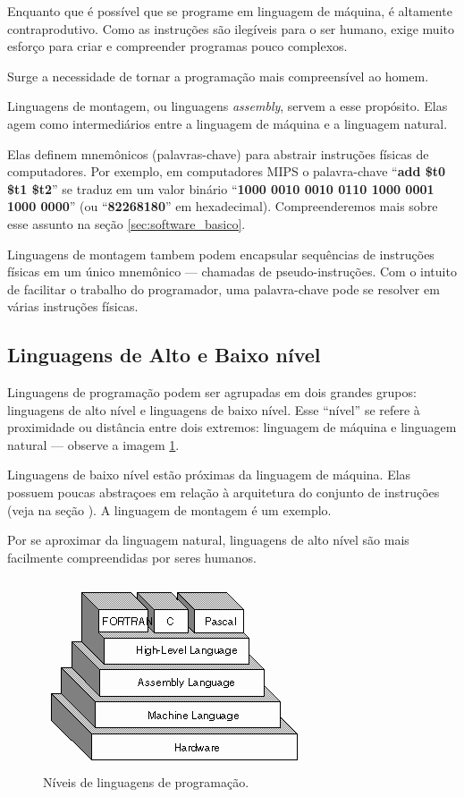 Enquanto que é possível que se programe em linguagem de máquina, é altamente
contraprodutivo. Como as instruções são ilegíveis para o ser humano, exige muito
esforço para criar e compreender programas pouco complexos.

Surge a necessidade de tornar a programação mais compreensível ao homem.

Linguagens de montagem, ou linguagens \textit{assembly}, servem a esse
propósito. Elas agem como intermediários entre a linguagem de máquina e a
linguagem natural.

Elas definem mnemônicos (palavras-chave) para abstrair instruções físicas de
computadores. Por exemplo, em computadores MIPS o palavra-chave ``\textbf{add
  \$t0 \$t1 \$t2}'' se traduz em um valor binário ``\textbf{1000 0010 0010 0110
  1000 0001 1000 0000}'' (ou ``\textbf{82268180}'' em
hexadecimal). Compreenderemos mais sobre esse assunto na seção
\ref{sec:software_basico}.

Linguagens de montagem tambem podem encapsular sequências de instruções físicas
em um único mnemônico --- chamadas de pseudo-instruções. Com o intuito de
facilitar o trabalho do programador, uma palavra-chave pode se resolver em
várias instruções físicas.

\subsection{Linguagens de Alto e Baixo nível}

Linguagens de programação podem ser agrupadas em dois grandes grupos: linguagens
de alto nível e linguagens de baixo nível. Esse ``nível'' se refere à
proximidade ou distância entre dois extremos: linguagem de máquina e linguagem
natural --- observe a imagem \ref{linguagens}.

Linguagens de baixo nível estão próximas da linguagem de máquina. Elas possuem
poucas abstraçoes em relação à arquitetura do conjunto de instruções (veja na
seção \label{subsec:apd}). A linguagem de montagem é um exemplo.

Por se aproximar da linguagem natural, linguagens de alto nível são mais
facilmente compreendidas por seres humanos.

\begin{figure}[ptb]
  \begin{center}
    \includegraphics[scale=.6]{imagens/1_linguagens}
  \end{center}
  \caption{Níveis de linguagens de programação.}
  \label{linguagens}
\end{figure}


